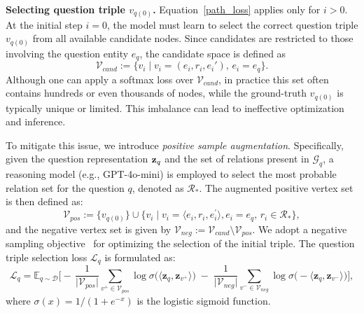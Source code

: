 \documentclass{article}
\theoremstyle{plain}
\theoremstyle{definition}
\theoremstyle{remark}
\newcommand{\tb}[1]{\textbf{#1}}
\newcommand{\mcal}[1]{\mathcal{#1}}
\begin{document}
\tb{Selecting question triple $v_{q(0)}$.} Equation~\ref{path_loss} applies only for $i>0$. At the initial step $i=0$, the model must learn to select the correct question triple $v_{q(0)}$ from all available candidate nodes. Since candidates are restricted to those involving the question entity $e_q$, the candidate space is defined as
\begin{equation}
\mcal{V}_{cand} := \{ v_i \mid v_i = (e_i, r_i, e_i'), \, e_i = e_q \}.
\end{equation}
Although one can apply a softmax loss over $\mcal{V}_{cand}$, in practice this set often contains hundreds or even thousands of nodes, while the ground-truth $v_{q(0)}$ is typically unique or limited. This imbalance can lead to ineffective optimization and inference.

To mitigate this issue, we introduce \textit{positive sample augmentation}. Specifically, given the question representation ${\mathbf{z}}_q$ and the set of relations present in $\mcal{G}_q$, a reasoning model (e.g., GPT-4o-mini) is employed to select the most probable relation set for the question $q$, denoted as $\mcal{R}_*$. The augmented positive vertex set is then defined as:
\begin{equation}
\mcal{V}_{pos} := \{ v_{q(0)} \} \cup \{ v_i \mid v_i=\langle e_i,r_i,e_i^\prime \rangle,e_i = e_q, \, r_i \in \mcal{R}_* \},
\end{equation}
and the negative vertex set is given by $\mcal{V}_{neg} := \mcal{V}_{cand} \setminus \mcal{V}_{pos}$.
We adopt a negative sampling objective~\cite{mikolov2013efficient} for optimizing the selection of the initial triple. The question triple selection loss $\mcal{L}_q$ is formulated as: 
\begin{equation}
\label{eq:L_q_neg_sampling}
\mathcal{L}_q =
\mathbb{E}_{q \sim \mathcal{D}}
\Biggl[
-\,
\frac{1}{\lvert \mathcal{V}_{pos} \rvert}
\sum_{v^{+}\in\mathcal{V}_{pos}}
\log \sigma\!\bigl( \langle \mathbf{z}_{q}, \mathbf{z}_{v^{+}} \rangle \bigr)
\;-\;
\frac{1}{\lvert \mathcal{V}_{neg} \rvert}
\sum_{v^{-}\in\mathcal{V}_{neg}}
\log \sigma\!\bigl( -\langle \mathbf{z}_{q}, \mathbf{z}_{v^{-}} \rangle \bigr)
\Biggr],
\end{equation}
where $\sigma(x) = 1 / (1 + e^{-x})$ is the logistic sigmoid function. 
\end{document}

